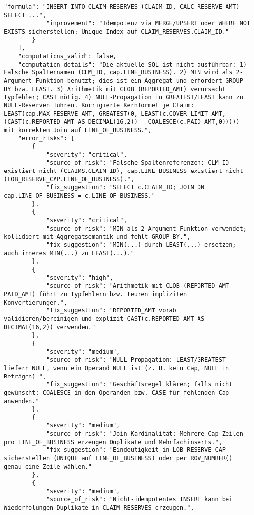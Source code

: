 \begin{lstlisting}[caption={Ausgabe: GPT-5 Anwendungsfall 10 Konsistenzdurchlauf},label={gpt_case10_prompt2}]
            "formula": "INSERT INTO CLAIM_RESERVES (CLAIM_ID, CALC_RESERVE_AMT) SELECT ...",
            "improvement": "Idempotenz via MERGE/UPSERT oder WHERE NOT EXISTS sicherstellen; Unique-Index auf CLAIM_RESERVES.CLAIM_ID."
        }
    ],
    "computations_valid": false,
    "computation_details": "Die aktuelle SQL ist nicht ausführbar: 1) Falsche Spaltennamen (CLM_ID, cap.LINE_BUSINESS). 2) MIN wird als 2-Argument-Funktion benutzt; dies ist ein Aggregat und erfordert GROUP BY bzw. LEAST. 3) Arithmetik mit CLOB (REPORTED_AMT) verursacht Typfehler; CAST nötig. 4) NULL-Propagation in GREATEST/LEAST kann zu NULL-Reserven führen. Korrigierte Kernformel je Claim: LEAST(cap.MAX_RESERVE_AMT, GREATEST(0, LEAST(c.COVER_LIMIT_AMT, (CAST(c.REPORTED_AMT AS DECIMAL(16,2)) - COALESCE(c.PAID_AMT,0))))) mit korrektem Join auf LINE_OF_BUSINESS.",
    "error_risks": [
        {
            "severity": "critical",
            "source_of_risk": "Falsche Spaltenreferenzen: CLM_ID existiert nicht (CLAIMS.CLAIM_ID), cap.LINE_BUSINESS existiert nicht (LOB_RESERVE_CAP.LINE_OF_BUSINESS).",
            "fix_suggestion": "SELECT c.CLAIM_ID; JOIN ON cap.LINE_OF_BUSINESS = c.LINE_OF_BUSINESS."
        },
        {
            "severity": "critical",
            "source_of_risk": "MIN als 2-Argument-Funktion verwendet; kollidiert mit Aggregatsemantik und fehlt GROUP BY.",
            "fix_suggestion": "MIN(...) durch LEAST(...) ersetzen; auch inneres MIN(...) zu LEAST(...)."
        },
        {
            "severity": "high",
            "source_of_risk": "Arithmetik mit CLOB (REPORTED_AMT - PAID_AMT) führt zu Typfehlern bzw. teuren impliziten Konvertierungen.",
            "fix_suggestion": "REPORTED_AMT vorab validieren/bereinigen und explizit CAST(c.REPORTED_AMT AS DECIMAL(16,2)) verwenden."
        },
        {
            "severity": "medium",
            "source_of_risk": "NULL-Propagation: LEAST/GREATEST liefern NULL, wenn ein Operand NULL ist (z. B. kein Cap, NULL in Beträgen).",
            "fix_suggestion": "Geschäftsregel klären; falls nicht gewünscht: COALESCE in den Operanden bzw. CASE für fehlenden Cap anwenden."
        },
        {
            "severity": "medium",
            "source_of_risk": "Join-Kardinalität: Mehrere Cap-Zeilen pro LINE_OF_BUSINESS erzeugen Duplikate und Mehrfachinserts.",
            "fix_suggestion": "Eindeutigkeit in LOB_RESERVE_CAP sicherstellen (UNIQUE auf LINE_OF_BUSINESS) oder per ROW_NUMBER() genau eine Zeile wählen."
        },
        {
            "severity": "medium",
            "source_of_risk": "Nicht-idempotentes INSERT kann bei Wiederholungen Duplikate in CLAIM_RESERVES erzeugen.",

\end{lstlisting}
